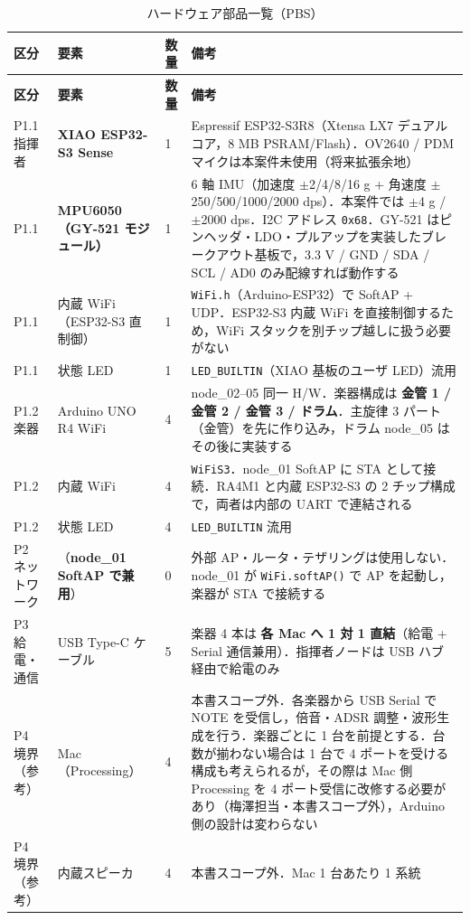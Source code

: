 \documentclass[lualatex,book,paper=a4paper,jafontsize=11.5pt,jafontscale=1.05]{jlreq}
\begin{document}
\begin{longtable}{p{} p{} p{} p{}}
\caption{ハードウェア部品一覧（PBS）}\label{tab:hw-pbs}\\
\toprule
\textbf{区分} & \textbf{要素} & \textbf{数量} & \textbf{備考} \\
\midrule
\endfirsthead
\toprule
\textbf{区分} & \textbf{要素} & \textbf{数量} & \textbf{備考} \\
\midrule
\endhead
P1.1 指揮者     & \textbf{XIAO ESP32-S3 Sense}  & 1 & Espressif ESP32-S3R8（Xtensa LX7 デュアルコア，8 MB PSRAM/Flash）．OV2640 / PDM マイクは本案件未使用（将来拡張余地） \\
P1.1            & \textbf{MPU6050（GY-521 モジュール）}   & 1 & 6 軸 IMU（加速度 $\pm$2/4/8/16 g + 角速度 $\pm$250/500/1000/2000 dps）．本案件では $\pm$4 g / $\pm$2000 dps．I2C アドレス \texttt{0x68}．GY-521 はピンヘッダ・LDO・プルアップを実装したブレークアウト基板で，3.3 V / GND / SDA / SCL / AD0 のみ配線すれば動作する \\
P1.1            & 内蔵 WiFi（ESP32-S3 直制御）  & 1 & \texttt{WiFi.h}（Arduino-ESP32）で SoftAP + UDP．ESP32-S3 内蔵 WiFi を直接制御するため，WiFi スタックを別チップ越しに扱う必要がない \\
P1.1            & 状態 LED                  & 1 & \texttt{LED\_BUILTIN}（XIAO 基板のユーザ LED）流用 \\
P1.2 楽器       & Arduino UNO R4 WiFi      & 4 & node\_02--05 同一 H/W．楽器構成は \textbf{金管 1 / 金管 2 / 金管 3 / ドラム}．主旋律 3 パート（金管）を先に作り込み，ドラム node\_05 はその後に実装する \\
P1.2            & 内蔵 WiFi                 & 4 & \texttt{WiFiS3}．node\_01 SoftAP に STA として接続．RA4M1 と内蔵 ESP32-S3 の 2 チップ構成で，両者は内部の UART で連結される \\
P1.2            & 状態 LED                  & 4 & \texttt{LED\_BUILTIN} 流用 \\
P2 ネットワーク & （\textbf{node\_01 SoftAP で兼用}） & 0 & 外部 AP・ルータ・テザリングは使用しない．node\_01 が \texttt{WiFi.softAP()} で AP を起動し，楽器が STA で接続する \\
P3 給電・通信   & USB Type-C ケーブル       & 5 & 楽器 4 本は \textbf{各 Mac へ 1 対 1 直結}（給電 + Serial 通信兼用）．指揮者ノードは USB ハブ経由で給電のみ \\
P4 境界（参考） & Mac（Processing）         & 4 & 本書スコープ外．各楽器から USB Serial で NOTE を受信し，倍音・ADSR 調整・波形生成を行う．楽器ごとに 1 台を前提とする．台数が揃わない場合は 1 台で 4 ポートを受ける構成も考えられるが，その際は Mac 側 Processing を 4 ポート受信に改修する必要があり（梅澤担当・本書スコープ外），Arduino 側の設計は変わらない \\
P4 境界（参考） & 内蔵スピーカ              & 4 & 本書スコープ外．Mac 1 台あたり 1 系統 \\
\bottomrule
\end{longtable}
\end{document}

